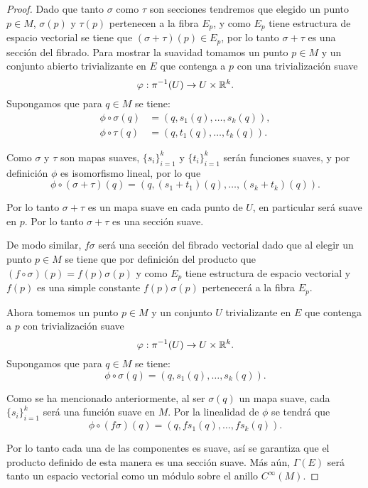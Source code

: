 \begin{proof}
	Dado que tanto $\sigma$ como $\tau$ son secciones tendremos que elegido un punto $p \in M$, $\sigma(p)$ y $\tau(p)$ pertenecen a la fibra $E_p$, y como $E_p$ tiene estructura de espacio vectorial se tiene que $(\sigma + \tau)(p) \in E_p$, por lo tanto $\sigma + \tau$ es una sección del fibrado. Para mostrar la suavidad tomamos un punto $p \in M$ y un conjunto abierto trivializante en $E$ que contenga a $p$ con una trivialización suave
	\[
		\varphi: \pi^{-1}(U) \to U \times \mathbb{R}^k.
	\]
	Supongamos que para $q \in M$ se tiene:
	\begin{align*}
		\phi \circ \sigma(q) & = (q, s_1(q), \dots, s_k(q)), \\
		\phi \circ \tau(q)   & = (q, t_1(q), \dots, t_k(q)).
	\end{align*}

	Como $\sigma$ y $\tau$ son mapas suaves, $\{s_i\}_{i=1}^k$ y  $\{t_i\}_{i=1}^k$ serán funciones suaves, y por definición $\phi$ es isomorfismo lineal, por lo que
	\[
		\phi \circ (\sigma + \tau)(q) = (q, (s_1 + t_1)(q), \dots, (s_k + t_k)(q)).
	\]

	Por lo tanto $\sigma + \tau$ es un mapa suave en cada punto de $U$, en particular será suave en $p$. Por lo tanto $\sigma + \tau$ es una sección suave.

	De modo similar, $f\sigma$ será una sección del fibrado vectorial dado que al elegir un punto $p \in M$ se tiene que por definición del producto que $(f \circ \sigma)(p) = f(p)\sigma(p)$ y como $E_p$ tiene estructura de espacio vectorial y $f(p)$ es una simple constante $f(p)\sigma(p)$ pertenecerá a la fibra $E_p$.

	Ahora tomemos un punto $p \in M$ y un conjunto $U$ trivializante en $E$ que contenga a $p$ con trivialización suave
	\[
		\varphi: \pi^{-1}(U) \to U \times \mathbb{R}^{k}.
	\]
	Supongamos que para $q \in M$ se tiene:
	\[
		\phi \circ \sigma(q) = (q, s_1(q), \dots, s_k(q)).
	\]

	Como se ha mencionado anteriormente, al ser $\sigma(q)$ un mapa suave, cada $\{s_i\}_{i=1}^k$ será una función suave en $M$. Por la linealidad de $\phi$ se tendrá que
	\[
		\phi \circ (f \sigma)(q) = (q, fs_1(q),\dots, fs_k(q)).
	\]

	Por lo tanto cada una de las componentes es suave, así se garantiza que el producto definido de esta manera es una sección suave. Más aún, $\Gamma(E)$ será tanto un espacio vectorial como un módulo sobre el anillo $C^{\infty}(M)$.
\end{proof}

